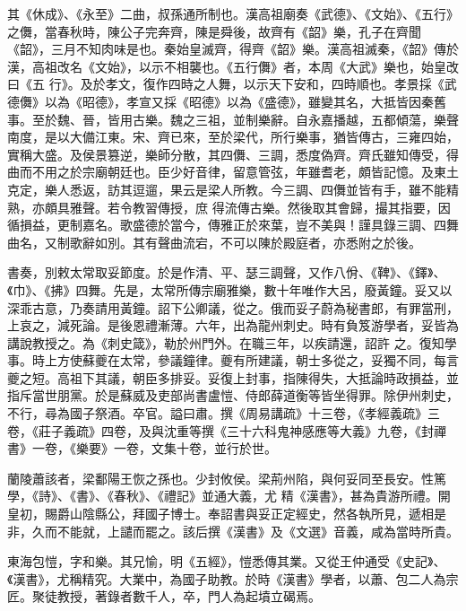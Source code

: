 \begin{pinyinscope}
 其《休成》、《永至》二曲，叔孫通所制也。漢高祖廟奏《武德》、《文始》、《五行》之儛，當春秋時，陳公子完奔齊，陳是舜後，故齊有《韶》樂，孔子在齊聞《韶》，三月不知肉味是也。秦始皇滅齊，得齊《韶》樂。漢高祖滅秦，《韶》傳於漢，高祖改名《文始》，以示不相襲也。《五行儛》者，本周《大武》樂也，始皇改曰《五
 行》。及於孝文，復作四時之人舞，以示天下安和，四時順也。孝景採《武德儛》以為《昭德》，孝宣又採《昭德》以為《盛德》，雖變其名，大抵皆因秦舊事。至於魏、晉，皆用古樂。魏之三祖，並制樂辭。自永嘉播越，五都傾蕩，樂聲南度，是以大備江東。宋、齊已來，至於梁代，所行樂事，猶皆傳古，三雍四始，實稱大盛。及侯景篡逆，樂師分散，其四儛、三調，悉度偽齊。齊氏雖知傳受，得曲而不用之於宗廟朝廷也。臣少好音律，留意管弦，年雖耆老，頗皆記憶。及東土克定，樂人悉返，訪其逗遛，果云是梁人所教。今三調、四儛並皆有手，雖不能精熟，亦頗具雅聲。若令教習傳授，庶
 得流傳古樂。然後取其會歸，撮其指要，因循損益，更制嘉名。歌盛德於當今，傳雅正於來葉，豈不美與！謹具錄三調、四舞曲名，又制歌辭如別。其有聲曲流宕，不可以陳於殿庭者，亦悉附之於後。



 書奏，別敕太常取妥節度。於是作清、平、瑟三調聲，又作八佾、《鞞》、《鐸》、《巾》、《拂》四舞。先是，太常所傳宗廟雅樂，數十年唯作大呂，廢黃鐘。妥又以深乖古意，乃奏請用黃鐘。詔下公卿議，從之。俄而妥子蔚為秘書郎，有罪當刑，上哀之，減死論。是後恩禮漸薄。六年，出為龍州刺史。時有負笈游學者，妥皆為講說教授之。為《刺史箴》，勒於州門外。在職三年，以疾請還，詔許
 之。復知學事。時上方使蘇夔在太常，參議鐘律。夔有所建議，朝士多從之，妥獨不同，每言夔之短。高祖下其議，朝臣多排妥。妥復上封事，指陳得失，大抵論時政損益，並指斥當世朋黨。於是蘇威及吏部尚書盧愷、侍郎薛道衡等皆坐得罪。除伊州刺史，不行，尋為國子祭酒。卒官。謚曰肅。撰《周易講疏》十三卷，《孝經義疏》三卷，《莊子義疏》四卷，及與沈重等撰《三十六科鬼神感應等大義》九卷，《封禪書》一卷，《樂要》一卷，文集十卷，並行於世。



 蘭陵蕭該者，梁鄱陽王恢之孫也。少封攸侯。梁荊州陷，與何妥同至長安。性篤學，《詩》、《書》、《春秋》、《禮記》並通大義，尤
 精《漢書》，甚為貴游所禮。開皇初，賜爵山陰縣公，拜國子博士。奉詔書與妥正定經史，然各執所見，遞相是非，久而不能就，上譴而罷之。該后撰《漢書》及《文選》音義，咸為當時所貴。



 東海包愷，字和樂。其兄愉，明《五經》，愷悉傳其業。又從王仲通受《史記》、《漢書》，尤稱精究。大業中，為國子助教。於時《漢書》學者，以蕭、包二人為宗匠。聚徒教授，著錄者數千人，卒，門人為起墳立碣焉。




\end{pinyinscope}
